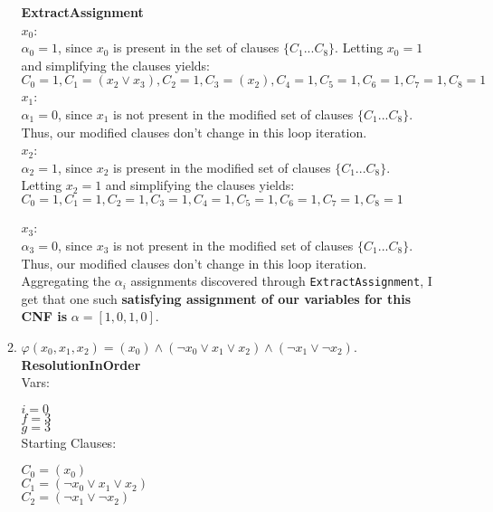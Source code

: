 \documentclass[11pt]{article}
\begin{document}
\begin{enumerate}
\begin{enumerate}
      \textbf{ExtractAssignment} \\

      $x_0$: \\
      $\alpha_0 = 1$, since $x_0$ is present in the set of clauses $\{ C_1 ... C_8 \}$. Letting $x_0 = 1$ and simplifying the clauses yields: \\
      $C_0 = 1, C_1 = (x_2 \vee x_3), C_2 = 1, C_3 = (x_2), C_4 = 1, C_5 = 1, C_6 = 1, C_7 = 1, C_8 = 1$ \\

      $x_1$: \\
      $\alpha_1 = 0$, since $x_1$ is not present in the modified set of clauses $\{ C_1 ... C_8 \}$. Thus, our modified clauses don't change in this loop iteration. \\

      $x_2$: \\
      $\alpha_2 = 1$, since $x_2$ is present in the modified set of clauses $\{ C_1 ... C_8 \}$. Letting $x_2 = 1$ and simplifying the clauses yields: \\
      $C_0 = 1, C_1 = 1, C_2 = 1, C_3 = 1, C_4 = 1, C_5 = 1, C_6 = 1, C_7 = 1, C_8 = 1$

      $x_3$: \\
      $\alpha_3 = 0$, since $x_3$ is not present in the modified set of clauses $\{ C_1 ... C_8 \}$. Thus, our modified clauses don't change in this loop iteration. \\

      Aggregating the $\alpha_i$ assignments discovered through \texttt{ExtractAssignment}, I get that one such \textbf{satisfying assignment of our variables for this CNF is} $\alpha = [1,0,1,0]$. \\

    \item $\varphi(x_0, x_1, x_2) = (x_0) \wedge (\neg x_0 \vee x_1 \vee x_2) \wedge (\neg x_1 \vee \neg x_2)$. \\

   \textbf{ResolutionInOrder}  \\

    Vars:
      
      $i = 0$ \\
      $f = 3$ \\
      $g = 3$ \\

      Starting Clauses:

      $C_0 = (x_0) $ \\
      $C_1 = (\neg x_0 \vee x_1 \vee x_2)$ \\
      $C_2 = (\neg x_1 \vee \neg x_2)$ \\


\end{enumerate}
\end{enumerate}
\end{document}

